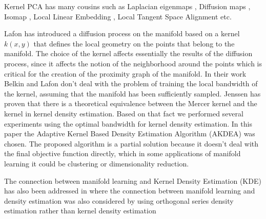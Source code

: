 \documentclass[12pt,letterpaper,doublespaced,ETD,dvips,proposal]{gtthesis}
\begin{document}
\begin{Body}
Kernel PCA has many cousins such as Laplacian eigenmaps
\cite{Belkin}, Diffusion maps  \cite{Lafon}, Isomap \cite{tenenbaum2000ggf}, 
Local Linear Embedding \cite{roweis1993ndr}, 
Local Tangent Space Alignment \cite{zhang2002pma} etc.

Lafon has introduced a diffusion process on the manifold based on a
kernel $k(x,y)$ that defines the local geometry on the points that
belong to the manifold. The choice of the kernel affects essentially
the results of the diffusion process, since it affects the notion of
the neighborhood around the points which is critical for the
creation of the proximity graph of the manifold. In their work
Belkin \cite{Belkin} and Lafon don't deal with the problem of training the local
bandwidth of the kernel, assuming that the manifold has been
sufficiently sampled. Jenssen \cite{jenssen17lpd} has proven  that
there is a theoretical equivalence between the Mercer kernel and the
kernel in kernel density estimation. Based on that fact we performed
several experiments using the optimal bandwidth for kernel density
estimation. In this paper the Adaptive Kernel Based Density
Estimation Algorithm (AKDEA) \cite{Silverman} was chosen. The
proposed algorithm is a partial solution because it doesn't deal
with the final objective function directly, which in some
applications of manifold learning it could be clustering or
dimensionality reduction.

The connection between manifold learning and Kernel Density Estimation (KDE) has also been addressed in \cite{girolami2002osd} where the connection between manifold
learning and density estimation was also considered by using
orthogonal series density estimation rather than kernel density
estimation



\end{Body}
\end{document}
